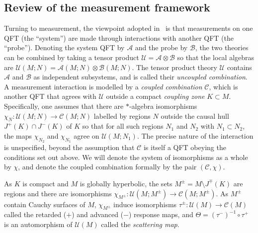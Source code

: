 \documentclass[sn-mathphys-num]{sn-jnl}%
\newcommand{\Af}{\mathscr{A}}
\newcommand{\Bf}{\mathscr{B}}
\newcommand{\Cf}{\mathscr{C}}
\newcommand{\Uf}{\mathscr{U}}
\numberwithin{equation}{section}
\theoremstyle{thmstyleone}%
\theoremstyle{thmstyletwo}%
\theoremstyle{thmstylethree}%
\begin{document}
\subsection{Review of the measurement framework}

Turning to measurement, the viewpoint adopted in~\cite{FewVer_QFLM:2018} is that measurements on one QFT (the ``system'') are made through interactions with another QFT (the ``probe''). Denoting the system QFT by $\Af$ and the probe by $\Bf$, the two theories can be combined by taking a tensor product $\Uf=\Af\otimes\Bf$ so that the local algebras are $\Uf(M;N)=\Af(M;N)\otimes\Bf(M;N)$. The tensor product theory $\Uf$ contains $\Af$ and $\Bf$ as independent subsystems, and is called their \emph{uncoupled combination}.
A measurement interaction is modelled by a \emph{coupled combination} $\Cf$, which is another QFT that agrees with $\Uf$ outside a compact \emph{coupling zone} $K\subset M$. 
Specifically, one assumes that there are $*$-algebra isomorphisms $\chi_N:\Uf(M;N)\to\Cf(M;N)$ labelled by regions $N$ outside the causal hull $J^+(K)\cap J^-(K)$ of $K$ so that
for all such regions $N_1$ and $N_2$ with $N_1\subset N_2$, the maps $\chi_{N_2}$ and $\chi_{N_1}$ agree on $\Uf(M;N_1)$. The precise nature of the interaction is unspecified, beyond the assumption that $\Cf$ is itself a QFT obeying the conditions set out above. We will denote the system of isomorphisms as a whole by $\chi$, and denote the coupled combination formally by the pair $(\Cf,\chi)$.

As $K$ is compact and $M$ is globally hyperbolic, the sets $M^\pm=M\setminus J^\mp(K)$ are regions and there are isomorphisms $\chi_{M^\pm}:\Uf(M;M^\pm)\to \Cf(M;M^\pm)$. As $M^\pm$ contain Cauchy surfaces of $M$, $\chi_{M^\pm}$ induce isomorphisms $\tau^\pm:\Uf(M)\to\Cf(M)$ called the retarded ($+$) and advanced ($-$) response maps, and $\Theta=(\tau^-)^{-1}\circ\tau^+$ is an automorphism of $\Uf(M)$ called the \emph{scattering map}.
\end{document}
